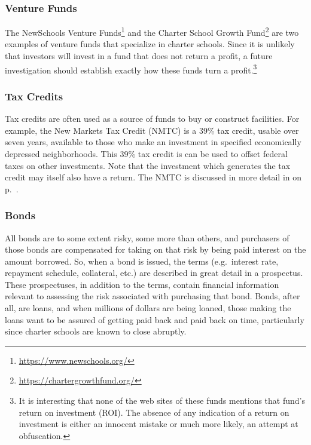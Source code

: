 \subsubsection{Venture Funds}\label{sec:venture-funds}\indent%

The NewSchools Venture Funds\footnote{\url{https://www.newschools.org/}} and the Charter School Growth Fund\footnote{\url{https://chartergrowthfund.org/}} are two examples of venture funds that specialize in charter schools. Since it is unlikely that investors will invest in a fund that does not return a profit, a future investigation should establish exactly how these funds turn a profit.\footnote{It is interesting that none of the web sites of these funds mentions that fund's return on investment (ROI). The absence of any indication of a return on investment is either an innocent mistake or much more likely, an attempt at obfuscation.}

\subsubsection{Tax Credits}\label{sec:tax-credits}\indent%

Tax credits are often used as a source of funds to buy or construct facilities. For example, the New Markets Tax Credit (NMTC) is a 39\% tax credit, usable over seven years, available to those who make an investment in specified economically depressed neighborhoods. This 39\% tax credit is can be used to offset federal taxes on other investments. Note that the investment which generates the tax credit may itself also have a return. The NMTC is discussed in more detail in  on p.~\pageref{sec:NMTC}.

\subsubsection{Bonds}\label{sec:bond-prospectuses}\indent%

All bonds are to some extent risky, some more than others, and purchasers of those bonds are compensated for taking on that risk by being paid interest on the amount borrowed. So, when a bond is issued, the terms (e.g. interest rate, repayment schedule, collateral, etc.) are described in great detail in a prospectus. These prospectuses, in addition to the terms, contain financial information relevant to assessing the risk associated with purchasing that bond. Bonds, after all, are loans, and when millions of dollars are being loaned, those making the loans want to be assured of getting paid back and paid back on time, particularly since charter schools are known to close abruptly.

